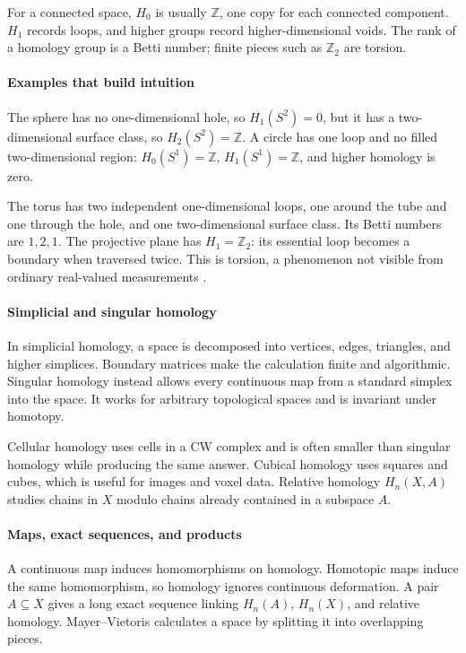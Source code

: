 For a connected space, $H_0$ is usually $\mathbb Z$, one copy for each connected component. $H_1$ records loops, and higher groups record higher-dimensional voids. The rank of a homology group is a Betti number; finite pieces such as $\mathbb Z_2$ are torsion.

\paragraph{Examples that build intuition}
The sphere has no one-dimensional hole, so $H_1(S^2)=0$, but it has a two-dimensional surface class, so $H_2(S^2)=\mathbb Z$. A circle has one loop and no filled two-dimensional region: $H_0(S^1)=\mathbb Z$, $H_1(S^1)=\mathbb Z$, and higher homology is zero.

The torus has two independent one-dimensional loops, one around the tube and one through the hole, and one two-dimensional surface class. Its Betti numbers are $1,2,1$. The projective plane has $H_1=\mathbb Z_2$: its essential loop becomes a boundary when traversed twice. This is torsion, a phenomenon not visible from ordinary real-valued measurements \cite{homology_theory_ref2}.

\paragraph{Simplicial and singular homology}
In simplicial homology, a space is decomposed into vertices, edges, triangles, and higher simplices. Boundary matrices make the calculation finite and algorithmic. Singular homology instead allows every continuous map from a standard simplex into the space. It works for arbitrary topological spaces and is invariant under homotopy.

Cellular homology uses cells in a CW complex and is often smaller than singular homology while producing the same answer. Cubical homology uses squares and cubes, which is useful for images and voxel data. Relative homology $H_n(X,A)$ studies chains in $X$ modulo chains already contained in a subspace $A$.

\paragraph{Maps, exact sequences, and products}
A continuous map induces homomorphisms on homology. Homotopic maps induce the same homomorphism, so homology ignores continuous deformation. A pair $A\subseteq X$ gives a long exact sequence linking $H_n(A)$, $H_n(X)$, and relative homology. Mayer--Vietoris calculates a space by splitting it into overlapping pieces.

